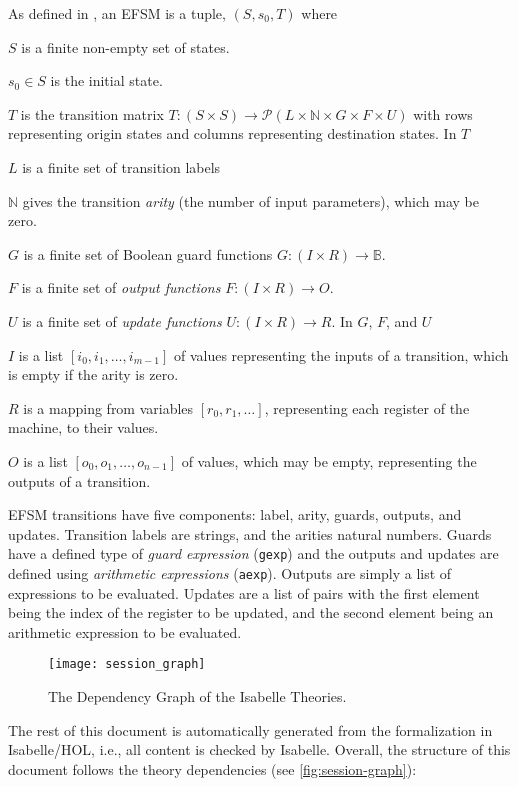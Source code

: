 \documentclass[10pt,DIV16,a4paper,abstract=true,twoside=semi,openright]{scrreprt}
\newcommand\mydescriptionlabel[1]{\hspace{\leftmargini}\textbf{#1}}
\newenvironment{where}{%
  \let\descriptionlabel\mydescriptionlabel
  \description[itemsep=0em, font=\normalfont]
}{%
  \enddescription
}
\begin{document}
As defined in \cite{foster2018}, an EFSM is a tuple, $(S, s_0, T)$ where
\begin{where}
  \item [$S$] is a finite non-empty set of states.
  \item [$s_0 \in S$]is the initial state.
  \item [$T$] is the transition matrix $T:(S \times S) \to \mathcal{P}(L \times \mathbb{N} \times G \times F \times U)$ with rows representing origin states and columns representing destination states.
\end{where}
In $T$
\begin{where}
  \item [$L$] is a finite set of transition labels
  \item [$\mathbb{N}$] gives the transition \emph{arity} (the number of input parameters), which may be zero.
  \item [$G$] is a finite set of Boolean guard functions $G:(I \times R) \to \mathbb{B}$.
  \item [$F$] is a finite set of \emph{output functions} $F:(I \times R) \to O$.
  \item [$U$] is a finite set of \emph{update functions} $U:(I \times R) \to R$.
\end{where}
In $G$, $F$, and $U$
\begin{where}
  \item [$I$] is a list $[i_0, i_1, \ldots, i_{m-1}]$ of values representing the inputs of a transition, which is empty if the arity is zero.
  \item [$R$] is a mapping from variables $[r_0, r_1, \ldots]$, representing each register of the machine, to their values.
  \item [$O$] is a list $[o_0, o_1, \ldots, o_{n-1}]$ of values, which may be empty, representing the outputs of a transition.
\end{where}

EFSM transitions have five components: label, arity, guards, outputs, and updates. Transition labels are strings, and the arities natural numbers. Guards have a defined type of \emph{guard expression} (\texttt{gexp}) and the outputs and updates are defined using \emph{arithmetic expressions} (\texttt{aexp}). Outputs are simply a list of expressions to be evaluated. Updates are a list of pairs with the first element being the index of the register to be updated, and the second element being an arithmetic expression to be evaluated.

\begin{figure}
  \centering
  \texttt{[image: session\_graph]}
  \caption{The Dependency Graph of the Isabelle Theories.\label{fig:session-graph}}
\end{figure}
The rest of this document is automatically generated from the
formalization in Isabelle/HOL, i.e., all content is checked by
Isabelle.  Overall, the structure of this document follows the
theory dependencies (see \autoref{fig:session-graph}):

\nocite{foster.ea:efsm:2018}

\clearpage




{\small
  
  
}
\end{document}
